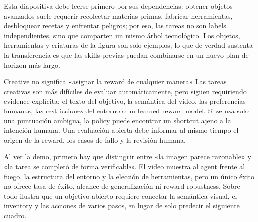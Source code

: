 Esta diapositiva debe leerse primero por sus dependencias: obtener objetos avanzados suele requerir recolectar materias primas, fabricar herramientas, desbloquear recetas y enfrentar peligros; por eso, las tareas no son labels independientes, sino que comparten un mismo árbol tecnológico. Los objetos, herramientas y criaturas de la figura son solo ejemplos; lo que de verdad sustenta la transferencia es que las skills previas puedan combinarse en un nuevo plan de horizon más largo.


\begin{warningbox}{Creative no significa «asignar la reward de cualquier manera»}
Las tareas creativas son más difíciles de evaluar automáticamente, pero siguen requiriendo evidence explícita: el texto del objetivo, la semántica del video, las preferencias humanas, las restricciones del entorno o un learned reward model. Si se usa solo una puntuación ambigua, la policy puede encontrar un shortcut ajeno a la intención humana. Una evaluación abierta debe informar al mismo tiempo el origen de la reward, los casos de fallo y la revisión humana.
\end{warningbox}


Al ver la demo, primero hay que distinguir entre «la imagen parece razonable» y «la tarea se completó de forma verificable». El video muestra al agent frente al fuego, la estructura del entorno y la elección de herramientas, pero un único éxito no ofrece tasa de éxito, alcance de generalización ni reward robustness. Sobre todo ilustra que un objetivo abierto requiere conectar la semántica visual, el inventory y las acciones de varios pasos, en lugar de solo predecir el siguiente cuadro.


